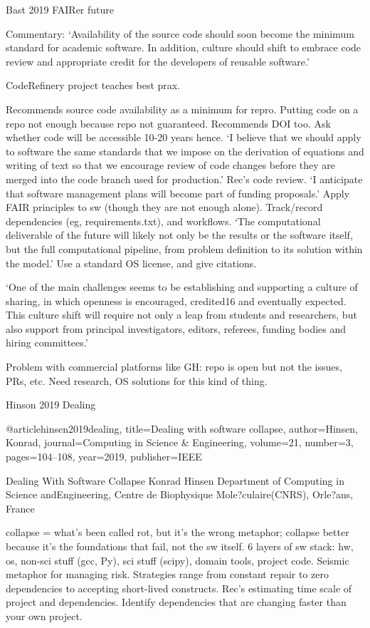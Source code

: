 \documentclass[12pt]{amsart}
\begin{document}
Bast 2019 FAIRer future

Commentary: `Availability of the source code should soon become the minimum standard for academic software. In addition, culture should shift to embrace code review and appropriate credit for the developers of reusable software.'

CodeRefinery project teaches best prax. 

Recommends source code availability as a minimum for repro. Putting code on a repo not enough because repo not guaranteed. Recommends DOI too. Ask whether code will be accessible 10-20 years hence. `I believe that we should apply to software the same standards that we impose on the derivation of equations and writing of text so that we encourage review of code changes before they are merged into the code branch used for production.' Rec's code review. `I anticipate that software management plans will become part of funding proposals.' Apply FAIR principles to sw (though they are not enough alone). Track/record dependencies (eg, requirements.txt), and workflows. `The computational deliverable of the future will likely not only be the results or the software itself, but the full computational pipeline, from problem definition to its solution within the model.' Use a standard OS license, and give citations. 

`One of the main challenges seems to be establishing and supporting a culture of sharing, in which openness is encouraged, credited16 and eventually expected. This culture shift will require not only a leap from students and researchers, but also support from principal investigators, editors, referees, funding bodies and hiring committees.'

Problem with commercial platforms like GH: repo is open but not the issues, PRs, etc. Need research, OS solutions for this kind of thing.


Hinson 2019 Dealing

@article{hinsen2019dealing,
  title={Dealing with software collapse},
  author={Hinsen, Konrad},
  journal={Computing in Science \& Engineering},
  volume={21},
  number={3},
  pages={104--108},
  year={2019},
  publisher={IEEE}
}

Dealing With Software Collapse Konrad Hinsen Department of Computing in Science andEngineering, Centre de Biophysique Mole?culaire(CNRS), Orle?ans, France

collapse = what's been called rot, but it's the wrong metaphor; collapse better because it's the foundations that fail, not the sw itself. 6 layers of sw stack: hw, os, non-sci stuff (gcc, Py), sci stuff (scipy), domain tools, project code.  Seismic metaphor for managing risk. Strategies range from constant repair to zero dependencies to accepting short-lived constructs. Rec's estimating time scale of project and dependencies. Identify dependencies that are changing faster than your own project.
\end{document}
